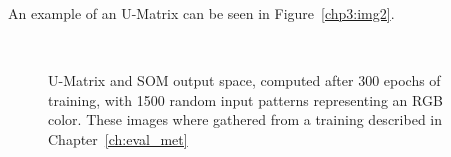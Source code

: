 An example of an \ac{U-Matrix} can be seen in Figure~\ref{chp3:img2}.

\begin{figure}[htpb]
  \centering
  \hspace*{0.5cm}
  \\
  \caption{U-Matrix and SOM output space, computed after 300 epochs of training, with 1500 random input patterns representing an RGB color. These images where gathered from a training described in Chapter~\ref{ch:eval_met}}
  \label{fig:umatrix_and_ouputspace}
\end{figure}


